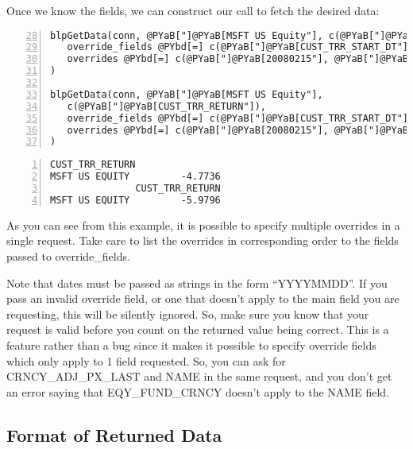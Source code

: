 \documentclass[a4paper]{article}
\begin{document}
    

Once we know the fields, we can construct our call to fetch the desired data:

\begin{Verbatim}[commandchars=@\[\],numbers=left,firstnumber=28,stepnumber=1]
blpGetData(conn, @PYaB["]@PYaB[MSFT US Equity"], c(@PYaB["]@PYaB[CUST_TRR_RETURN"]),
   override_fields @PYbd[=] c(@PYaB["]@PYaB[CUST_TRR_START_DT"], @PYaB["]@PYaB[CUST_TRR_END_DT"]), 
   overrides @PYbd[=] c(@PYaB["]@PYaB[20080215"], @PYaB["]@PYaB[20080602"])
)

blpGetData(conn, @PYaB["]@PYaB[MSFT US Equity"], 
   c(@PYaB["]@PYaB[CUST_TRR_RETURN"]), 
   override_fields @PYbd[=] c(@PYaB["]@PYaB[CUST_TRR_START_DT"], @PYaB["]@PYaB[CUST_TRR_END_DT"], @PYaB["]@PYaB[CUST_TRR_CRNCY"]), 
   overrides @PYbd[=] c(@PYaB["]@PYaB[20080215"], @PYaB["]@PYaB[20080602"], @PYaB["]@PYaB[GBP"])
)
\end{Verbatim}

    

\begin{Verbatim}[commandchars=@\[\],numbers=left,firstnumber=1,stepnumber=1]
               CUST_TRR_RETURN
MSFT US EQUITY         -4.7736
               CUST_TRR_RETURN
MSFT US EQUITY         -5.9796
\end{Verbatim}

    

As you can see from this example, it is possible to specify multiple overrides in a single request. Take care to list the overrides in corresponding order to the fields passed to override\_fields.

Note that dates must be passed as strings in the form ``YYYYMMDD''. If you pass an invalid override field, or one that doesn't apply to the main field you are requesting, this will be silently ignored. So, make sure you know that your request is valid before you count on the returned value being correct. This is a feature rather than a bug since it makes it possible to specify override fields which only apply to 1 field requested. So, you can ask for CRNCY\_ADJ\_PX\_LAST and NAME in the same request, and you don't get an error saying that EQY\_FUND\_CRNCY doesn't apply to the NAME field.


\subsection{Format of Returned Data} %
\label{sub:format_of_returned_data}
\end{document}
